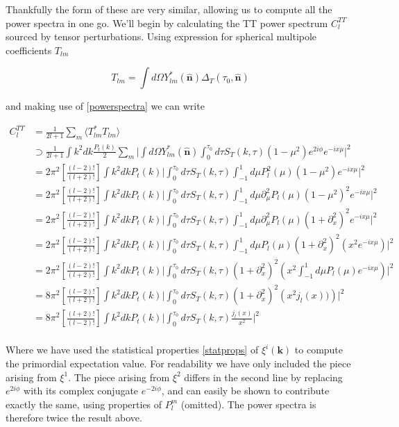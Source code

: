 \documentclass[a4paper,10pt]{article}
\renewcommand{\v}[1]{\mathbf{#1}}
\newcommand{\unit}[1]{\hat{\v{#1}}}
\newcommand{\ltwo}{\left[\frac{(l+2)!}{(l-2)!}\right]}
\newcommand{\ltwof}{\left[\frac{(l-2)!}{(l+2)!}\right]}
\begin{document}
Thankfully the form of these are very similar, allowing us to compute all the power spectra in one go. We'll begin by calculating the TT power spectrum $C_l^{TT}$ sourced by tensor perturbations. Using expression for spherical multipole coefficients $T_{lm}$  

\begin{equation}
T_{lm} = \int d\Omega Y_{lm}^*(\unit{n})\Delta_T(\tau_0,\unit{n})
\end{equation}

and making use of \ref{powerspectra} we can write 

\begin{equation}\begin{split}
C_l^{TT} &= \frac{1}{2l+1}\sum_m \langle T_{lm}^*T_{lm} \rangle \\
&\supset \frac{1}{2l+1} \int k^2 dk \frac{P_t(k)}{2} \sum_m \bigg| \int d\Omega Y^*_{lm}(\unit{n}) \int_0^{\tau_0} d\tau  S_T(k,\tau)(1-\mu^2)e^{2i\phi}e^{-ix\mu} \bigg|^2\\
&= 2\pi^2\ltwof \int k^2 dk P_t(k) \bigg|  \int_0^{\tau_0} d\tau  S_T(k,\tau)\int_{-1}^1 d\mu P_l^2(\mu)(1-\mu^2)e^{-ix\mu} \bigg|^2\\
&= 2\pi^2\ltwof \int k^2 dk P_t(k) \bigg|  \int_0^{\tau_0} d\tau  S_T(k,\tau)\int_{-1}^1 d\mu \partial_\mu^2P_l(\mu)(1-\mu^2)^2e^{-ix\mu}\bigg|^2\\
&= 2\pi^2\ltwof \int k^2 dk P_t(k) \bigg|  \int_0^{\tau_0} d\tau  S_T(k,\tau)\int_{-1}^1 d\mu \partial_\mu^2P_l(\mu)(1+\partial_x^2)^2e^{-ix\mu} \bigg|^2\\
&= 2\pi^2\ltwof \int k^2 dk P_t(k) \bigg|  \int_0^{\tau_0} d\tau  S_T(k,\tau)\int_{-1}^1 d\mu P_l(\mu)(1+\partial_x^2)^2(x^2e^{-ix\mu}) \bigg|^2\\
&= 2\pi^2\ltwof \int k^2 dk P_t(k) \bigg|  \int_0^{\tau_0} d\tau  S_T(k,\tau)(1+\partial_x^2)^2\left(x^2 \int_{-1}^1 d\mu P_l(\mu)e^{-ix\mu} \right)\bigg|^2\\
&= 8\pi^2\ltwof \int k^2 dk P_t(k) \bigg|  \int_0^{\tau_0} d\tau  S_T(k,\tau) (1+\partial_x^2)^2\left(x^2j_l(x)) \right)\bigg|^2\\
&= 8\pi^2\ltwo \int k^2 dk P_t(k) \bigg|  \int_0^{\tau_0} d\tau  S_T(k,\tau)\frac{j_l(x)}{x^2} \bigg|^2\\
\end{split}\end{equation}

Where we have used the statistical properties \ref{statprops} of $\xi^i(\v{k})$ to compute the primordial expectation value. For readability we have only included the piece arising from $\xi^1$. The piece arising from $\xi^2$ differs in the second line by replacing $e^{2i\phi}$ with its complex conjugate $e^{-2i\phi}$, and can easily be shown to contribute exactly the same, using properties of $P_l^m$ (omitted). The power spectra is therefore twice the result above.\\
\end{document}
